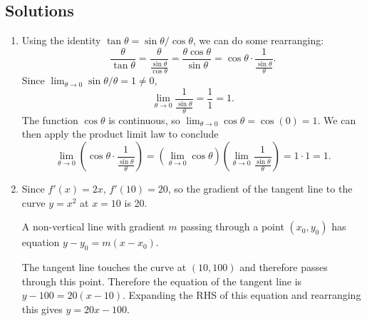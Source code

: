 \documentclass[12pt,a4paper]{article}
\newcommand{\rar}{\rightarrow}
\begin{document}
\subsection*{Solutions}
\begin{enumerate}
	\item Using the identity $\tan \theta = \sin \theta / \cos \theta$, we can do some rearranging:
\[
	\frac{\theta}{\tan \theta} = \frac{\theta}{\frac{\sin \theta}{\cos \theta}} = \frac{\theta \cos \theta}{\sin \theta} = \cos \theta \cdot \frac{1}{\frac{\sin \theta}{\theta}}.
\]
Since $\lim_{\theta \rar 0} \sin \theta / \theta = 1 \ne 0$, 
\[
	\lim_{\theta \rar 0} \frac{1}{\frac{\sin \theta}{\theta}} = \frac{1}{1} = 1.
\]
The function $\cos \theta$ is continuous, so $\lim_{\theta \rar 0} \cos \theta = \cos(0) = 1$. We can then apply the product limit law to conclude
\[
	\lim_{\theta \rar 0} \left( \cos \theta \cdot \frac{1}{\frac{\sin \theta}{\theta}} \right) = \left( \lim_{\theta \rar 0} \cos \theta \right) \left( \lim_{\theta \rar 0} \frac{1}{\frac{\sin \theta}{\theta}} \right) = 1 \cdot 1 = 1.
\]
	\item Since $f'(x) = 2x$, $f'(10) = 20$, so the gradient of the tangent line to the curve $y = x^2$ at $x = 10$ is 20.

 A non-vertical line with gradient $m$ passing through a point $(x_0,y_0)$ has equation $y - y_0 = m(x - x_0)$.

The tangent line touches the curve at $(10,100)$ and therefore passes through this point. Therefore the equation of the tangent line is $y - 100 = 20(x - 10)$. Expanding the RHS of this equation and rearranging this gives $y = 20x - 100$.


\end{enumerate}
\end{document}
